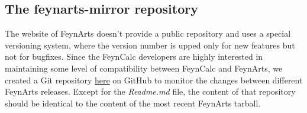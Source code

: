 \documentclass[../FeynCalcManual.tex]{subfiles}
\begin{document}
\hypertarget{the-feynarts-mirror-repository}{%
\subsection{The feynarts-mirror
repository}\label{the-feynarts-mirror-repository}}

The website of FeynArts doesn't provide a public repository and uses a
special versioning system, where the version number is upped only for
new features but not for bugfixes. Since the FeynCalc developers are
highly interested in maintaining some level of compatibility between
FeynCalc and FeynArts, we created a Git repository
\href{https://github.com/FeynCalc/feynarts-mirror}{here} on GitHub to
monitor the changes between different FeynArts releases. Except for the
\emph{Readme.md} file, the content of that repository should be
identical to the content of the most recent FeynArts tarball.
\end{document}
